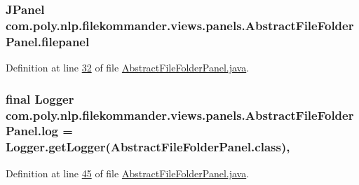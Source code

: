 \hypertarget{classcom_1_1poly_1_1nlp_1_1filekommander_1_1views_1_1panels_1_1_abstract_file_folder_panel_abd069d68f414efb9497427f7df50e7f5}{
\subsubsection[{filepanel}]{\setlength{\rightskip}{0pt plus 5cm}J\-Panel com.\-poly.\-nlp.\-filekommander.\-views.\-panels.\-Abstract\-File\-Folder\-Panel.\-filepanel\hspace{0.3cm}{\ttfamily [private]}}}\label{classcom_1_1poly_1_1nlp_1_1filekommander_1_1views_1_1panels_1_1_abstract_file_folder_panel_abd069d68f414efb9497427f7df50e7f5}


Definition at line \hyperlink{L32}{32} of file \hyperlink{}{Abstract\-File\-Folder\-Panel.\-java}.

\hypertarget{classcom_1_1poly_1_1nlp_1_1filekommander_1_1views_1_1panels_1_1_abstract_file_folder_panel_ac381bcdeb4de3de4b96846422b4db0c4}{
\subsubsection[{log}]{\setlength{\rightskip}{0pt plus 5cm}final Logger com.\-poly.\-nlp.\-filekommander.\-views.\-panels.\-Abstract\-File\-Folder\-Panel.\-log = Logger.\-get\-Logger(Abstract\-File\-Folder\-Panel.\-class)\hspace{0.3cm}{\ttfamily [static]}, {\ttfamily [private]}}}\label{classcom_1_1poly_1_1nlp_1_1filekommander_1_1views_1_1panels_1_1_abstract_file_folder_panel_ac381bcdeb4de3de4b96846422b4db0c4}


Definition at line \hyperlink{L45}{45} of file \hyperlink{}{Abstract\-File\-Folder\-Panel.\-java}.

